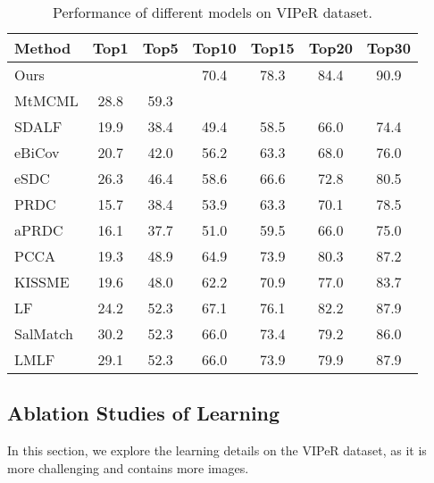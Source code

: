 \documentclass[review]{elsarticle}
\begin{document}
\begin{table}[tbp]
\small
\centering 
\begin{tabular}{lcccccc  }
\hline
Method &Top1 &Top5 &Top10 &Top15 &Top20 &Top30\\ \hline \vspace{0.1mm}  
Ours & & &70.4 &78.3 &84.4 &90.9\\ \vspace{0.1mm}
MtMCML &28.8 &59.3 & & & &\\ \vspace{0.1mm} 
SDALF &19.9 &38.4 &49.4 &58.5 &66.0 &74.4\\  \vspace{0.1mm}
eBiCov &20.7 &42.0 &56.2 &63.3 &68.0 &76.0\\ \vspace{0.1mm}
eSDC &26.3 &46.4 &58.6 &66.6 &72.8 &80.5\\  \vspace{0.1mm}
PRDC &15.7 &38.4 &53.9 &63.3 &70.1 &78.5\\  \vspace{0.1mm}
aPRDC &16.1 &37.7 &51.0 &59.5 &66.0 &75.0\\  \vspace{0.1mm}
PCCA &19.3 &48.9 &64.9 &73.9 &80.3 &87.2\\  \vspace{0.1mm}
KISSME &19.6 &48.0 &62.2 &70.9 &77.0 &83.7\\  \vspace{0.1mm}
LF &24.2 &52.3 &67.1 &76.1 &82.2 &87.9\\  \vspace{0.1mm}
SalMatch &30.2 &52.3 &66.0 &73.4 &79.2 &86.0\\  \vspace{0.1mm}
LMLF &29.1 &52.3 &66.0 &73.9 &79.9 &87.9\\  \hline 

\end{tabular}
\caption{Performance of different models on VIPeR dataset. }
\label{table:per-viper}
\end{table}



\subsection{Ablation Studies of Learning}

In this section, we explore the learning details on the VIPeR dataset, as it is more challenging and contains more images. 
\end{document}
